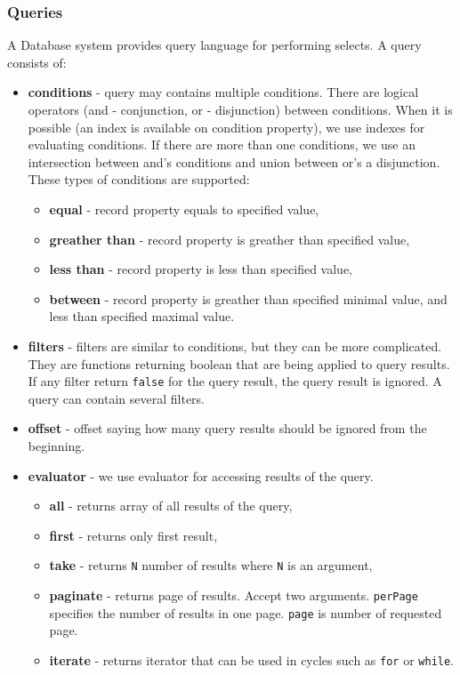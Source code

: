 \subsubsection{Queries} 
A Database system provides query language for performing selects. A query consists of:
\begin{itemize}
    \item \textbf{conditions} - query may contains multiple conditions. There are logical operators (and - conjunction, or - disjunction) between conditions. When it is possible (an index is available on condition property), we use indexes for evaluating conditions. If there are more than one conditions, we use an intersection between and's conditions and union between or's a disjunction. These types of conditions are supported:
    \begin{itemize}
        \item \textbf{equal} - record property equals to specified value,
        \item \textbf{greather than} - record property is greather than specified value,
        \item \textbf{less than} - record property is less than specified value,
        \item \textbf{between} - record property is greather than specified minimal value, and less than specified maximal value.
    \end{itemize} 
    \item \textbf{filters} - filters are similar to conditions, but they can be more complicated. They are functions returning boolean that are being applied to query results. If any filter return \texttt{false} for the query result, the query result is ignored. A query can contain several filters.
    \item \textbf{offset} - offset saying how many query results should be ignored from the beginning.
    \item \textbf{evaluator} - we use evaluator for accessing results of the query.
    \begin{itemize}
        \item \textbf{all} - returns array of all results of the query,
        \item \textbf{first} - returns only first result,
        \item \textbf{take} - returns \texttt{N} number of results where \texttt{N} is an argument,
        \item \textbf{paginate} - returns page of results. Accept two arguments. \texttt{perPage} specifies the number of results in one page. \texttt{page} is number of requested page.
        \item \textbf{iterate} - returns iterator that can be used in cycles such as \texttt{for} or \texttt{while}.
    \end{itemize}
\end{itemize}  


